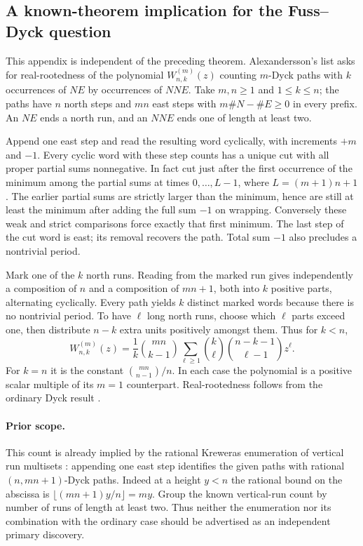 \documentclass[11pt,a4paper]{article}
\numberwithin{equation}{section}
\theoremstyle{definition}
\theoremstyle{remark}
\begin{document}
\subsection{A known-theorem implication for the Fuss--Dyck question}
This appendix is independent of the preceding theorem. Alexandersson's list \cite{r40heisei:alex} asks for real-rootedness of the polynomial $W^{(m)}_{n,k}(z)$ counting $m$-Dyck paths with $k$ occurrences of $NE$ by occurrences of $NNE$. Take $m,n\ge1$ and $1\le k\le n$; the paths have $n$ north steps and $mn$ east steps with $m\#N-\#E\ge0$ in every prefix. An $NE$ ends a north run, and an $NNE$ ends one of length at least two.

Append one east step and read the resulting word cyclically, with increments $+m$ and $-1$. Every cyclic word with these step counts has a unique cut with all proper partial sums nonnegative. In fact cut just after the first occurrence of the minimum among the partial sums at times $0,\ldots,L-1$, where $L=(m+1)n+1$. The earlier partial sums are strictly larger than the minimum, hence are still at least the minimum after adding the full sum $-1$ on wrapping. Conversely these weak and strict comparisons force exactly that first minimum. The last step of the cut word is east; its removal recovers the path. Total sum $-1$ also precludes a nontrivial period.

Mark one of the $k$ north runs. Reading from the marked run gives independently a composition of $n$ and a composition of $mn+1$, both into $k$ positive parts, alternating cyclically. Every path yields $k$ distinct marked words because there is no nontrivial period. To have $\ell$ long north runs, choose which $\ell$ parts exceed one, then distribute $n-k$ extra units positively amongst them. Thus for $k<n$,
\[
 W^{(m)}_{n,k}(z)=\frac1k\binom{mn}{k-1}
 \sum_{\ell\ge1}\binom{k}{\ell}\binom{n-k-1}{\ell-1}z^{\ell}.
\]
For $k=n$ it is the constant $\binom{mn}{n-1}/n$. In each case the polynomial is a positive scalar multiple of its $m=1$ counterpart. Real-rootedness follows from the ordinary Dyck result \cite{r40heisei:wz}.

\paragraph{Prior scope.} This count is already implied by the rational Kreweras enumeration of vertical run multisets \cite{r40heisei:br}: appending one east step identifies the given paths with rational $(n,mn+1)$-Dyck paths. Indeed at a height $y<n$ the rational bound on the abscissa is $\lfloor(mn+1)y/n\rfloor=my$. Group the known vertical-run count by number of runs of length at least two. Thus neither the enumeration nor its combination with the ordinary case should be advertised as an independent primary discovery.
\end{document}
